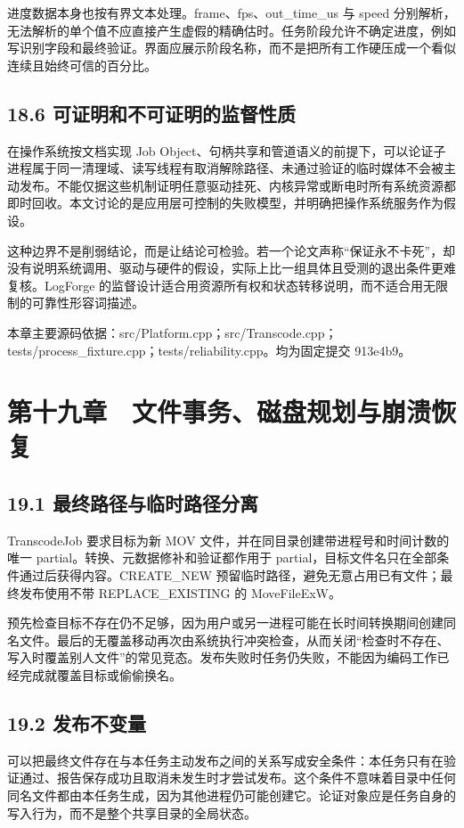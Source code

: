 \documentclass[UTF8,zihao=-4,openany]{ctexbook}
\begin{document}
进度数据本身也按有界文本处理。frame、fps、out\_time\_us 与 speed 分别解析，无法解析的单个值不应直接产生虚假的精确估时。任务阶段允许不确定进度，例如写识别字段和最终验证。界面应展示阶段名称，而不是把所有工作硬压成一个看似连续且始终可信的百分比。


\section*{18.6 可证明和不可证明的监督性质}
在操作系统按文档实现 Job Object、句柄共享和管道语义的前提下，可以论证子进程属于同一清理域、读写线程有取消解除路径、未通过验证的临时媒体不会被主动发布。不能仅据这些机制证明任意驱动挂死、内核异常或断电时所有系统资源都即时回收。本文讨论的是应用层可控制的失败模型，并明确把操作系统服务作为假设。

这种边界不是削弱结论，而是让结论可检验。若一个论文声称“保证永不卡死”，却没有说明系统调用、驱动与硬件的假设，实际上比一组具体且受测的退出条件更难复核。LogForge 的监督设计适合用资源所有权和状态转移说明，而不适合用无限制的可靠性形容词描述。


\par\small 本章主要源码依据：src/Platform.cpp；src/Transcode.cpp；tests/process\_fixture.cpp；tests/reliability.cpp。均为固定提交 913e4b9。\normalsize

\chapter*{第十九章　文件事务、磁盘规划与崩溃恢复}

\section*{19.1 最终路径与临时路径分离}
TranscodeJob 要求目标为新 MOV 文件，并在同目录创建带进程号和时间计数的唯一 partial。转换、元数据修补和验证都作用于 partial，目标文件名只在全部条件通过后获得内容。CREATE\_NEW 预留临时路径，避免无意占用已有文件；最终发布使用不带 REPLACE\_EXISTING 的 MoveFileExW。

预先检查目标不存在仍不足够，因为用户或另一进程可能在长时间转换期间创建同名文件。最后的无覆盖移动再次由系统执行冲突检查，从而关闭“检查时不存在、写入时覆盖别人文件”的常见竞态。发布失败时任务仍失败，不能因为编码工作已经完成就覆盖目标或偷偷换名。


\section*{19.2 发布不变量}
可以把最终文件存在与本任务主动发布之间的关系写成安全条件：本任务只有在验证通过、报告保存成功且取消未发生时才尝试发布。这个条件不意味着目录中任何同名文件都由本任务生成，因为其他进程仍可能创建它。论证对象应是任务自身的写入行为，而不是整个共享目录的全局状态。
\end{document}
